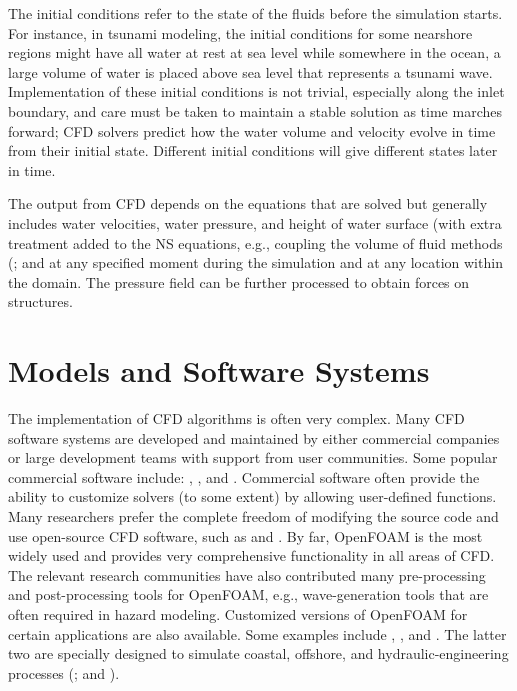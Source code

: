 The initial conditions refer to the state of the fluids before the simulation starts. For instance, in tsunami modeling, the initial conditions for some nearshore regions might have all water at rest at sea level while somewhere in the ocean, a large volume of water is placed above sea level that represents a tsunami wave. Implementation of these initial conditions is not trivial, especially along the inlet boundary, and care must be taken to maintain a stable solution as time marches forward;  CFD solvers predict how the water volume and velocity evolve in time from their initial state. Different initial conditions will give different states later in time.

The output from CFD depends on the equations that are solved but generally includes water velocities, water pressure, and height of water surface (with extra treatment added to the NS equations, e.g., coupling the volume of fluid methods (\cite{Brackbill1992VOF, Hirt1981VOF, Jasak1996VOF, Ubbink1997VOF}; and  \cite{Ubbink2002VOF} at any specified moment during the simulation and at any location within the domain. The pressure field can be further processed to obtain forces on structures.

\section{Models and Software Systems}
\label{sec:resp_cfd_water_methods}

The implementation of CFD algorithms is often very complex. Many CFD software systems are developed and maintained by either commercial companies or large development teams with support from user communities. Some popular commercial software include: , , and . Commercial software often provide the ability to customize solvers (to some extent) by allowing user-defined functions. Many researchers prefer the complete freedom of modifying the source code and use open-source CFD software, such as  and . By far, OpenFOAM is the most widely used and provides very comprehensive functionality in all areas of CFD. The relevant research communities have also contributed many pre-processing and post-processing tools for OpenFOAM, e.g., wave-generation tools that are often required in hazard modeling. Customized versions of OpenFOAM for certain applications are also available. Some examples include , , and . The latter two are specially designed to simulate coastal, offshore, and hydraulic-engineering processes (\cite{Higuera2013OlaFlow, Higuera2013bOlaFlow, Higuera2014OlaFlow, Higuera2014bOlaFlow}; and \cite{Higuera2015OlaFlow}).

